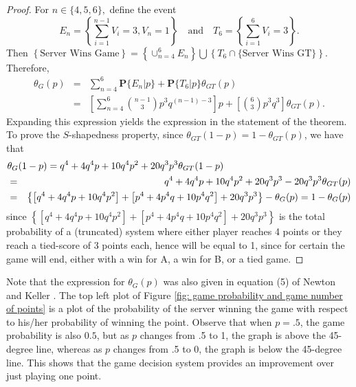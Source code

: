 \documentclass[11pt]{article}
\theoremstyle{plain}
\theoremstyle{definition}
\renewcommand{\Pr}{\mathbf{P}}
\begin{document}
\begin{proof}
For $n \in \{4,5,6\},$ define the event
%
$$E_n = \left\{\sum_{i=1}^{n-1} V_i = 3, V_n = 1\right\} \quad \mbox{and} \quad
T_6 = \left\{\sum_{i=1}^6 V_i = 3\right\}.$$
%
Then
%
$\left\{\mbox{Server Wins Game}\right\} = \left\{\cup_{n=4}^6 E_n \right\} \bigcup \left\{T_6 \cap \{\mbox{Server Wins GT}\}\right\}.$
%
Therefore,
%
\begin{eqnarray*}
\theta_G(p) & = & \sum_{n=4}^6 \Pr\{E_n|p\} + \Pr\{T_6|p\} \theta_{GT}(p) \\ 
 & = &  \left[\sum_{n=4}^6 {{n-1} \choose 3} p^3 q^{(n-1)-3}\right] p + \left[{6 \choose 3} p^3 q^3\right] \theta_{GT}(p).
\end{eqnarray*}
%
Expanding this expression yields the expression in the statement of the theorem.   To prove the $S$-shapedness property, since $\theta_{GT}(1-p) = 1 - \theta_{GT}(p)$, we have that
    \begin{eqnarray*}
       \lefteqn{ \theta_G(1-p)  =  q^4 +4q^4p + 10q^4p^2 + 20q^3p^3\theta_{GT}(1-p) } \\
        & = & q^4 +4q^4p + 10q^4p^2 + 20q^3p^3 - 20q^3p^3 \theta_{GT}(p) \\
        & = & \left\{\left[q^4 +4q^4p + 10q^4p^2\right] + 
         \left[p^4 +4p^4q + 10p^4q^2\right] + 20q^3p^3\right\} - \theta_{G}(p) 
          =  1 - \theta_G(p)
    \end{eqnarray*}
    since $\left\{\left[q^4 +4q^4p + 10q^4p^2\right] + 
         \left[p^4 +4p^4q + 10p^4q^2\right] + 20q^3p^3\right\}$ is the total probability of a (truncated) system where either player reaches 4 points or they reach a tied-score of 3 points each, hence will be equal to 1, since for certain the game will end, either with a win for A, a win for B, or a tied game.
\end{proof}

Note that the expression for $\theta_G(p)$ was also given in equation (5) of Newton and Keller \cite{Newton_Keller_2005}. The top left plot of Figure \ref{fig: game probability and game number of points} is a plot of the probability of the server winning the game with respect to his/her probability of winning the point. Observe that when $p=.5$, the game probability is also $0.5$, but as $p$ changes from .5 to 1, the graph is above the 45-degree line, whereas as $p$ changes from .5 to 0, the graph is below the 45-degree line. This shows that the game decision system provides an improvement over just playing one point. 
\end{document}

